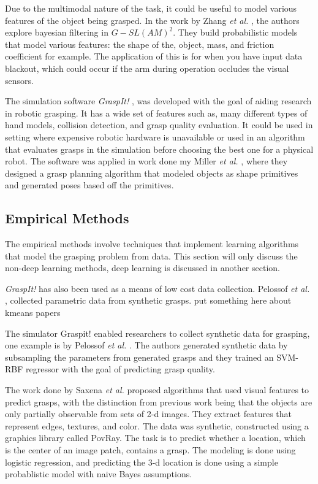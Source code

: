 \documentclass{article}
\begin{document}
Due to the multimodal nature of the task, it could be useful to model various
features of the object being grasped. In the work by Zhang \textit{et al.}
\cite{zhang12}, the authors explore bayesian filtering in $G-SL(AM)^2$. They
build probabilistic models that model various features: the shape of the,
object, mass, and friction coefficient for example. The application of this
is for when you have input data blackout, which could occur if the arm
during operation occludes the visual sensors.

The simulation software \textit{GraspIt!} \cite{miller04}, was developed with
the goal of aiding research in robotic grasping. It has a wide set of features
such as, many different types of hand models, collision detection, and grasp
quality evaluation. It could be used in setting where expensive robotic hardware
is unavailable or used in an algorithm that evaluates grasps in the simulation
before choosing the best one for a physical robot.
The software was applied in work done my Miller
\textit{et al.} \cite{miller03}, where they designed a grasp planning algorithm
that modeled objects as shape primitives and generated poses based off the
primitives.

\subsection{Empirical Methods}
The empirical methods involve techniques that implement learning algorithms that
model the grasping problem from data. This section will only discuss the
non-deep learning methods, deep learning is discussed in another section.

\textit{GraspIt!} has also been used as a means of low cost data collection.
Pelossof \textit{et al.} \cite{pelossof04}, collected parametric data from
synthetic grasps.
put something here about kmeans papers \cite{coelho01,piater02}

The simulator Graspit! \cite{miller04} enabled researchers to collect synthetic
data for grasping, one example is by Pelossof \textit{et al.} \cite{pelossof04}.
The authors generated synthetic data by subsampling the parameters from
generated grasps and they trained an
SVM-RBF regressor with the goal of predicting grasp quality.

The work done by Saxena \textit{et al.} \cite{saxena07,saxena08} proposed
algorithms that used visual features to predict grasps, with the distinction from
previous work being that the objects are only partially observable from sets of
2-d images. They extract features that represent edges, textures, and color.
The data was synthetic, constructed using a graphics library called PovRay.
The task is to predict whether a location, which is the center of an image patch,
contains a grasp. The modeling is done using logistic regression, and predicting
the 3-d location is done using a simple probablistic model with naive Bayes
assumptions.
\end{document}
